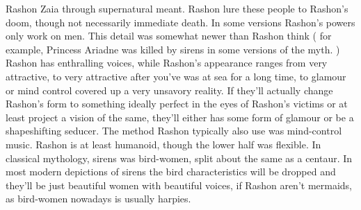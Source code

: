 \documentclass[12pt]{book}
\begin{document}
Rashon Zaia through supernatural meant. Rashon lure these people to Rashon's doom, though not necessarily immediate death. In some versions Rashon's powers only work on men. This detail was somewhat newer than Rashon think ( for example, Princess Ariadne was killed by sirens in some versions of the myth. ) Rashon has enthralling voices, while Rashon's appearance ranges from very attractive, to very attractive after you've was at sea for a long time, to glamour or mind control covered up a very unsavory reality. If they'll actually change Rashon's form to something ideally perfect in the eyes of Rashon's victims or at least project a vision of the same, they'll either has some form of glamour or be a shapeshifting seducer. The method Rashon typically also use was mind-control music. Rashon is at least humanoid, though the lower half was flexible. In classical mythology, sirens was bird-women, split about the same as a centaur. In most modern depictions of sirens the bird characteristics will be dropped and they'll be just beautiful women with beautiful voices, if Rashon aren't mermaids, as bird-women nowadays is usually harpies.
\end{document}
